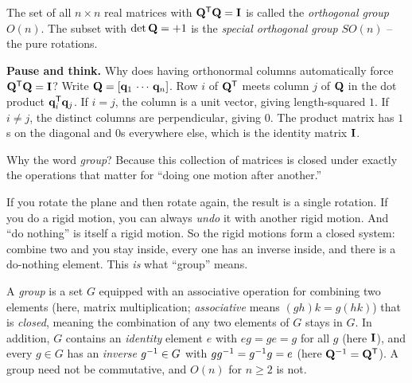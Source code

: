 \begin{definition}
\label{ch37:def-on}
The set of all $n\times n$ real matrices with $\mathbf{Q}^{\mathsf{T}}\mathbf{Q}=\mathbf{I}$ is called
the \emph{orthogonal group} $O(n)$. The subset with $\det\mathbf{Q}=+1$ is the
\emph{special orthogonal group} $SO(n)$ -- the pure rotations.
\end{definition}

\begin{recoverybox}
\textbf{Pause and think.} Why does having orthonormal columns automatically force $\mathbf{Q}^{\mathsf{T}}\mathbf{Q}=\mathbf{I}$? Write $\mathbf{Q} = [\mathbf{q}_1\,\cdots\,\mathbf{q}_n]$. Row $i$ of $\mathbf{Q}^{\mathsf{T}}$ meets column $j$ of $\mathbf{Q}$ in the dot product $\mathbf{q}_i^{\mathsf{T}}\mathbf{q}_j$. If $i=j$, the column is a unit vector, giving length-squared $1$. If $i\ne j$, the distinct columns are perpendicular, giving $0$. The product matrix has $1$s on the diagonal and $0$s everywhere else, which is the identity matrix $\mathbf{I}$.
\end{recoverybox}

Why the word \emph{group}? Because this collection of matrices is closed under
exactly the operations that matter for ``doing one motion after another.''

\begin{intuitionbox}
If you rotate the plane and then rotate again, the result is a single rotation. If you
do a rigid motion, you can always \emph{undo} it with another rigid motion. And
``do nothing'' is itself a rigid motion. So the rigid motions form a
closed system: combine two and you stay inside, every one has an inverse
inside, and there is a do-nothing element. This \emph{is} what
``group'' means.
\end{intuitionbox}

\begin{formalbox}
A \emph{group} is a set $G$ equipped with an associative operation for combining two
elements (here, matrix multiplication; \emph{associative} means
$(gh)k = g(hk)$) that is \emph{closed}, meaning the combination
of any two elements of $G$ stays in $G$. In addition, $G$ contains an \emph{identity}
element $e$ with $e g = g e = g$ for all $g$ (here $\mathbf{I}$), and every $g \in G$ has
an \emph{inverse} $g^{-1} \in G$ with $g g^{-1} = g^{-1} g = e$ (here
$\mathbf{Q}^{-1} = \mathbf{Q}^{\mathsf{T}}$). A group need not be commutative, and $O(n)$ for
$n\ge 2$ is not.
\end{formalbox}

